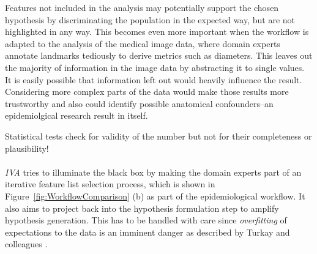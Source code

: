 \documentclass[journal]{style/vgtc} 			          %
\begin{document}
%
%
Features not included in the analysis may potentially support the chosen hypothesis by discriminating the population in the expected way, but are not highlighted in any way.
%
This becomes even more important when the workflow is adapted to the analysis of the medical image data, where
domain experts annotate landmarks tediously to derive metrics such as diameters. %
%
This leaves out the majority of information in the image data by abstracting it to single values.
%
It is easily possible that information left out would heavily influence the result.
%
Considering more complex parts of the data would make those results more trustworthy and also could identify possible anatomical confounders--an epidemiolgical research result in itself.

Statistical tests check for validity of the number but not for their completeness or plausibility!
\\\\
\emph{IVA} tries to illuminate the black box by making the domain experts part of an iterative feature list selection process, which is shown in Figure~\ref{fig:WorkflowComparison} (b) as part of the epidemiological workflow.
%
%
It also aims to project back into the hypothesis formulation step to amplify hypothesis generation.
%
This has to be handled with care since \emph{overfitting} of expectations to the data is an imminent danger as described by Turkay and colleagues \cite{Turkay2013}.
\end{document}

